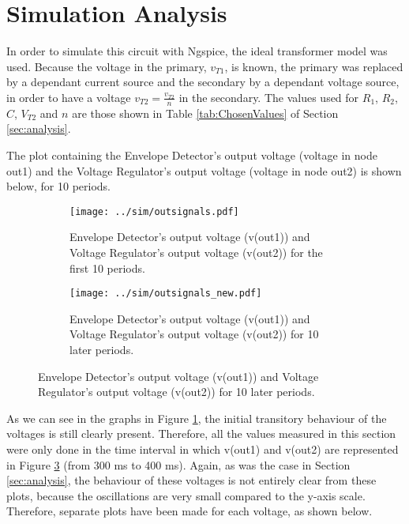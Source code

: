 \section{Simulation Analysis} \label{sec:simulation}

In order to simulate this circuit with Ngspice, the ideal transformer model was used. Because the voltage in the primary, $v_{T1}$, is known, the primary was replaced by a dependant current source and the secondary by a dependant voltage source, in order to have a voltage $v_{T2}=\frac{v_{T2}}{n}$ in the secondary. The values used for $R_1$, $R_2$, $C$, $V_{T2}$ and $n$ are those shown in Table \ref{tab:ChosenValues} of Section \ref{sec:analysis}.
\par
The plot containing the Envelope Detector's output voltage (voltage in node out1) and the Voltage Regulator's output voltage (voltage in node out2) is shown below, for 10 periods.

\begin{figure}[H]
  \begin{subfigure}{.49\linewidth}
    \centering
    \texttt{[image: ../sim/outsignals.pdf]}
    \footnotesize
  \caption{Envelope Detector's output voltage (v(out1)) and Voltage Regulator's output voltage (v(out2)) for the first 10 periods.}
   \label{fig:out1_out2}
  \end{subfigure}
  \hspace{5mm}
  \begin{subfigure}{.49\linewidth}
    \centering
  \texttt{[image: ../sim/outsignals\_new.pdf]}
  \caption{Envelope Detector's output voltage (v(out1)) and Voltage Regulator's output voltage (v(out2)) for 10 later periods.}
  \label{fig:out1_out2_new}
  \end{subfigure}
\end{figure}

As we can see in the graphs in Figure \ref{fig:out1_out2}, the initial transitory behaviour of the voltages is still clearly present. Therefore, all the values measured in this section were only done in the time interval in which v(out1) and v(out2) are represented in Figure \ref{fig:out1_out2_new} (from 300 ms to 400 ms). Again, as was the case in Section \ref{sec:analysis}, the behaviour of these voltages is not entirely clear from these plots, because the oscillations are very small compared to the y-axis scale. Therefore, separate plots have been made for each voltage, as shown below.

